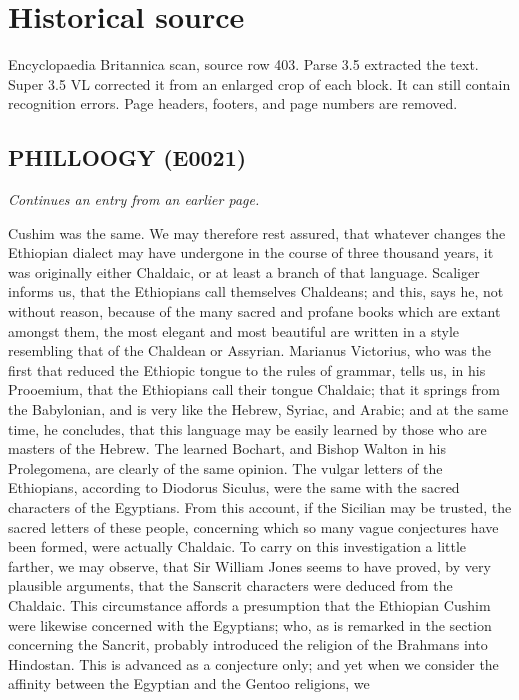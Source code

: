 \documentclass{article}
\begin{document}
\section*{Historical source}
Encyclopaedia Britannica scan, source row 403. Parse 3.5 extracted the text. Super 3.5 VL corrected it from an enlarged crop of each block. It can still contain recognition errors.
Page headers, footers, and page numbers are removed.

\subsection*{PHILLOOGY (E0021)}
\textit{Continues an entry from an earlier page.}

Cushim was the same. We may therefore rest assured, that whatever changes the Ethiopian dialect may have undergone in the course of three thousand years, it was originally either Chaldaic, or at least a branch of that language. Scaliger informs us, that the Ethiopians call themselves Chaldeans; and this, says he, not without reason, because of the many sacred and profane books which are extant amongst them, the most elegant and most beautiful are written in a style resembling that of the Chaldean or Assyrian. Marianus Victorius, who was the first that reduced the Ethiopic tongue to the rules of grammar, tells us, in his Prooemium, that the Ethiopians call their tongue Chaldaic; that it springs from the Babylonian, and is very like the Hebrew, Syriac, and Arabic; and at the same time, he concludes, that this language may be easily learned by those who are masters of the Hebrew. The learned Bochart, and Bishop Walton in his Prolegomena, are clearly of the same opinion. The vulgar letters of the Ethiopians, according to Diodorus Siculus, were the same with the sacred characters of the Egyptians. From this account, if the Sicilian may be trusted, the sacred letters of these people, concerning which so many vague conjectures have been formed, were actually Chaldaic. To carry on this investigation a little farther, we may observe, that Sir William Jones seems to have proved, by very plausible arguments, that the Sanscrit characters were deduced from the Chaldaic. This circumstance affords a presumption that the Ethiopian Cushim were likewise concerned with the Egyptians; who, as is remarked in the section concerning the Sancrit, probably introduced the religion of the Brahmans into Hindostan. This is advanced as a conjecture only; and yet when we consider the affinity between the Egyptian and the Gentoo religions, we
\end{document}
